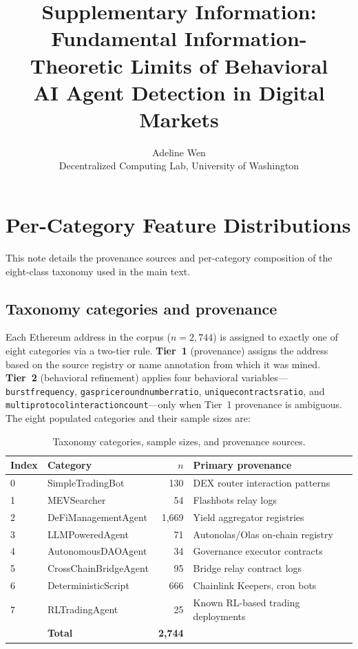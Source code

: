 \documentclass[11pt,a4paper]{article}
\title{Supplementary Information:\\
Fundamental Information-Theoretic Limits of Behavioral\\
AI Agent Detection in Digital Markets}
\author{Adeline Wen\\
\small Decentralized Computing Lab, University of Washington}
\date{}
\renewcommand{\_}{\oldunderscore\allowbreak}
\begin{document}
\maketitle
\tableofcontents
\clearpage

\section{Per-Category Feature Distributions}
\label{sec:note1}

This note details the provenance sources and per-category composition
of the eight-class taxonomy used in the main text.

\subsection{Taxonomy categories and provenance}

Each Ethereum address in the corpus ($n = 2{,}744$) is assigned to exactly
one of eight categories via a two-tier rule. \textbf{Tier~1} (provenance)
assigns the address based on the source registry or name annotation from
which it was mined. \textbf{Tier~2} (behavioral refinement) applies four
behavioral variables---\texttt{burst\_frequency},
\texttt{gas\_price\_round\_number\_ratio},
\texttt{unique\_contracts\_ratio}, and
\texttt{multi\_protocol\_interaction\_count}---only when Tier~1 provenance
is ambiguous. The eight populated categories and their sample sizes are:

\begin{table}[h]
\centering
\caption{Taxonomy categories, sample sizes, and provenance sources.}
\label{tab:taxonomy}
\begin{tabular}{llrl}
\toprule
\textbf{Index} & \textbf{Category} & \textbf{$n$} & \textbf{Primary provenance} \\
\midrule
0 & SimpleTradingBot      & 130   & DEX router interaction patterns \\
1 & MEVSearcher           & 54    & Flashbots relay logs \\
2 & DeFiManagementAgent   & 1{,}669 & Yield aggregator registries \\
3 & LLMPoweredAgent       & 71    & Autonolas/Olas on-chain registry \\
4 & AutonomousDAOAgent    & 34    & Governance executor contracts \\
5 & CrossChainBridgeAgent & 95    & Bridge relay contract logs \\
6 & DeterministicScript   & 666   & Chainlink Keepers, cron bots \\
7 & RLTradingAgent        & 25    & Known RL-based trading deployments \\
\midrule
  & \textbf{Total}        & \textbf{2{,}744} & \\
\bottomrule
\end{tabular}
\end{table}
\end{document}

